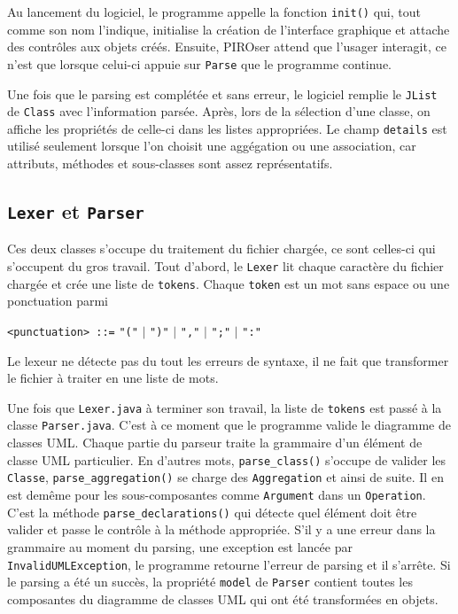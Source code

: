 \documentclass[12pt]{article}
\begin{document}
Au lancement du logiciel, le programme appelle la fonction \texttt{init()} qui, tout comme son nom l'indique, initialise la création de l'interface graphique et attache des contrôles aux objets créés. Ensuite, PIROser attend que l'usager interagit, ce n'est que lorsque celui-ci appuie sur \texttt{Parse} que le programme continue.

Une fois que le parsing est complétée et sans erreur, le logiciel remplie le \texttt{JList} de \texttt{Class} avec l'information parsée. Après, lors de la sélection d'une classe, on affiche les propriétés de celle-ci dans les listes appropriées. Le champ \texttt{details} est utilisé seulement lorsque l'on choisit une aggégation ou une association, car attributs, méthodes et sous-classes sont assez représentatifs.


\subsection{\texttt{Lexer} et \texttt{Parser}}

Ces deux classes s'occupe du traitement du fichier chargée, ce sont celles-ci qui s'occupent du gros travail.
Tout d'abord, le \texttt{Lexer} lit chaque caractère du fichier chargée et crée une liste de \texttt{tokens}. Chaque \texttt{token} est un mot sans espace ou une ponctuation parmi

\begin{center}

\texttt{<punctuation> ::=} \texttt{"("} 
$|$ \texttt{")"} 
$|$ \texttt{","}
$|$ \texttt{";"}
$|$ \texttt{":"}

\end{center}

Le lexeur ne détecte pas du tout les erreurs de syntaxe, il ne fait que transformer le fichier à traiter en une liste de mots.

Une fois que \texttt{Lexer.java} à terminer son travail, la liste de \texttt{tokens} est passé à la classe \texttt{Parser.java}. C'est à ce moment que le programme valide le diagramme de classes UML. Chaque partie du parseur traite la grammaire d'un élément de classe UML particulier. En d'autres mots, \texttt{parse\_class()} s'occupe de valider les \texttt{Classe}, \texttt{parse\_aggregation()} se charge des \texttt{Aggregation} et ainsi de suite. Il en est demême pour les sous-composantes comme \texttt{Argument} dans un \texttt{Operation}. C'est la méthode \texttt{parse\_declarations()} qui détecte quel élément doit être valider et passe le contrôle à la méthode appropriée. S'il y a une erreur dans la grammaire au moment du parsing, une exception est lancée par \texttt{InvalidUMLException}, le programme retourne l'erreur de parsing et il s'arrête. Si le parsing a été un succès, la propriété \texttt{model} de \texttt{Parser} contient toutes les composantes du diagramme de classes UML qui ont été transformées en objets.
\end{document}
